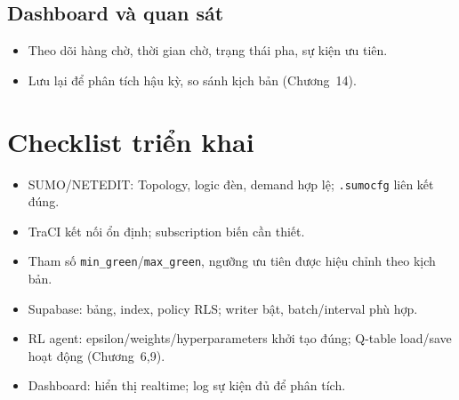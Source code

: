 \subsection{Dashboard và quan sát}
\begin{itemize}
    \item Theo dõi hàng chờ, thời gian chờ, trạng thái pha, sự kiện ưu tiên.
    \item Lưu lại để phân tích hậu kỳ, so sánh kịch bản (Chương~14).
\end{itemize}

\section{Checklist triển khai}
\begin{itemize}
    \item SUMO/NETEDIT: Topology, logic đèn, demand hợp lệ; \texttt{.sumocfg} liên kết đúng.
    \item TraCI kết nối ổn định; subscription biến cần thiết.
    \item Tham số \texttt{min\_green}/\texttt{max\_green}, ngưỡng ưu tiên được hiệu chỉnh theo kịch bản.
    \item Supabase: bảng, index, policy RLS; writer bật, batch/interval phù hợp.
    \item RL agent: epsilon/weights/hyperparameters khởi tạo đúng; Q-table load/save hoạt động (Chương~6,9).
    \item Dashboard: hiển thị realtime; log sự kiện đủ để phân tích.
\end{itemize}

